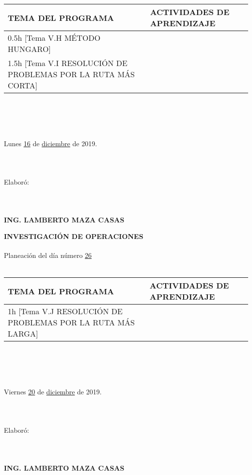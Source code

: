 \documentclass[landscape]{article}
\begin{document}
{\begin{center}
\begin{tabular}{|p{11cm}|p{8cm}|}
{\bf TEMA DEL PROGRAMA}&{\bf ACTIVIDADES DE APRENDIZAJE}\\\hline
	0.5h	[Tema V.H M\'ETODO HUNGARO]
&\\
	1.5h	[Tema V.I RESOLUCI\'ON DE PROBLEMAS POR LA RUTA M\'AS CORTA]
&\\
\hline
\end{tabular}
\ \\
\ \\
\ \\
\ \\
Lunes \underline{\hspace{0.5cm}16\hspace{0.5cm}} de  \underline{\hspace{0.5cm}diciembre\hspace{0.5cm}} de 2019.
\ \\
\ \\
\ \\
\ \\
Elabor\'o:
\ \\
\ \\
\ \\
\ \\
{\bf ING. LAMBERTO MAZA CASAS}
\end{center}
\eject
\begin{center}
{\bf 
INVESTIGACI\'ON DE OPERACIONES
}
\ \\
\ \\
Planeaci\'on del d\'ia n\'umero \underline{\hspace{0.5cm}26\hspace{0.5cm}}
\ \\
\ \\
\begin{tabular}{|p{11cm}|p{8cm}|}\hline
{\bf TEMA DEL PROGRAMA}&{\bf ACTIVIDADES DE APRENDIZAJE}\\\hline
	1h	[Tema V.J RESOLUCI\'ON DE PROBLEMAS POR LA RUTA M\'AS LARGA]
&\\
\hline
\end{tabular}
\ \\
\ \\
\ \\
\ \\
Viernes \underline{\hspace{0.5cm}20\hspace{0.5cm}} de  \underline{\hspace{0.5cm}diciembre\hspace{0.5cm}} de 2019.
\ \\
\ \\
\ \\
\ \\
Elabor\'o:
\ \\
\ \\
\ \\
\ \\
{\bf ING. LAMBERTO MAZA CASAS}
\end{center}
\eject
}
\end{document}
